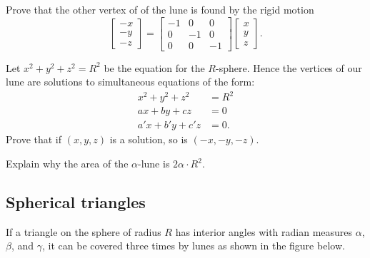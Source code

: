 \documentclass[newpage,hints,12pt,handout,nooutcomes,noauthor]{ximera}
\begin{document}
\begin{problem}
  Prove that the other vertex of of the lune is found by the rigid motion%
  \[
  \begin{bmatrix}-x\\-y\\-z\end{bmatrix}=
    \begin{bmatrix}
      -1 & 0 & 0\\
      0 & -1 & 0\\
      0 & 0 & -1
    \end{bmatrix}
    \begin{bmatrix}x\\y\\z\end{bmatrix}.
  \]
  \begin{hint}
    Let $x^2 + y^2 + z^2 = R^2$ be the equation for the
    $R$-sphere. Hence the vertices of our lune are solutions to
    simultaneous equations of the form:
    \begin{align*}
      x^2 + y^2 + z^2 &= R^2\\
      ax + by + cz &= 0\\
      a'x + b'y + c'z &= 0.
    \end{align*}
    Prove that if $(x,y,z)$ is a solution, so is $(-x,-y,-z)$.
  \end{hint}
\end{problem}





\begin{problem}
\label{67} Explain why the area of the $\alpha$-lune is $2\alpha
\cdot R^{2}$.
\end{problem}


\subsection{Spherical triangles}

If a triangle on the sphere of radius $R$ has interior angles with radian
measures $\alpha$, $\beta$, and $\gamma$, it can be covered three times by
lunes as shown in the figure below.%
\end{document}
